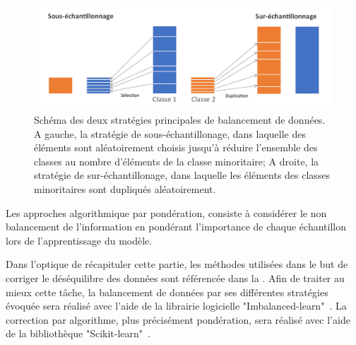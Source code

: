 \begin{figure}[H]
    \centering
    \includegraphics[width=\linewidth]{contents/chapter_4/resources/scheme_data_balancing.pdf}
    \caption{Schéma des deux stratégies principales de balancement de données. A gauche, la stratégie de sous-échantillonage, dans laquelle des éléments sont aléatoirement choisis jusqu'à réduire l'ensemble des classes au nombre d'éléments de la classe minoritaire; A droite, la stratégie de sur-échantillonage, dans laquelle les éléments des classes minoritaires sont dupliqués aléatoirement. }
    \label{fig:scheme_data_balancing}
\end{figure}\par

Les approches algorithmique par pondération, consiste à considérer le non balancement de l'information en pondérant l'importance de chaque échantillon lors de l'apprentissage du modèle.  

Dans l'optique de récapituler cette partie, les méthodes utilisées dans le but de corriger le déséquilibre des données sont référencée dans la . Afin de traiter au mieux cette tâche, la balancement de données par ses différentes stratégies évoquée sera réalisé avec l'aide de la librairie logicielle "Imbalanced-learn"~\cite{Lemaitre2017}. La correction par algorithme, plus précisément pondération, sera réalisé avec l'aide de la bibliothèque "Scikit-learn"~\cite{pedregosa2011}.\par

